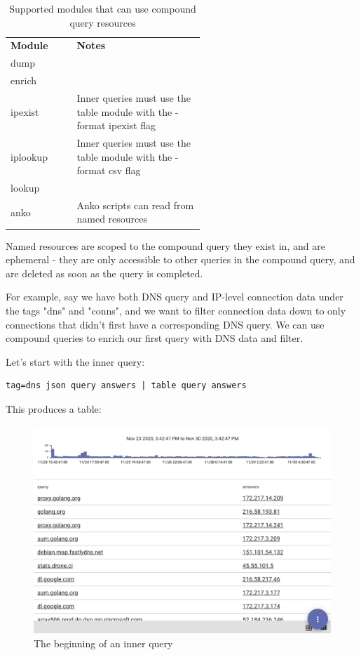 \begin{table}[H]
\begin{tabular}{ | p{0.15\linewidth} | p{0.4\linewidth} | }
\hline
\textbf{Module} & \textbf{Notes}\\
dump & \\
\hline
enrich & \\
\hline
ipexist & Inner queries must use the table module with the -format ipexist flag \\
\hline
iplookup & Inner queries must use the table module with the -format csv flag \\
\hline
lookup & \\
\hline
anko & Anko scripts can read from named resources \\
\hline
\end{tabular}
	\caption{Supported modules that can use compound query resources}
\label{table:supported-modules}
\end{table}

Named resources are scoped to the compound query they exist in, and are
ephemeral - they are only accessible to other queries in the compound query,
and are deleted as soon as the query is completed.

For example, say we have both DNS query and IP-level connection data under the
tags "dns" and "conns", and we want to filter connection data down to only
connections that didn't first have a corresponding DNS query. We can use
compound queries to enrich our first query with DNS data and filter.

Let's start with the inner query:

\begin{verbatim}
tag=dns json query answers | table query answers
\end{verbatim}

This produces a table:

\begin{figure}[H]
	\includegraphics[width=0.6\linewidth]{images/compound-table1.png}
	\caption{The beginning of an inner query}
	\label{fig:compound-table1}
\end{figure}

